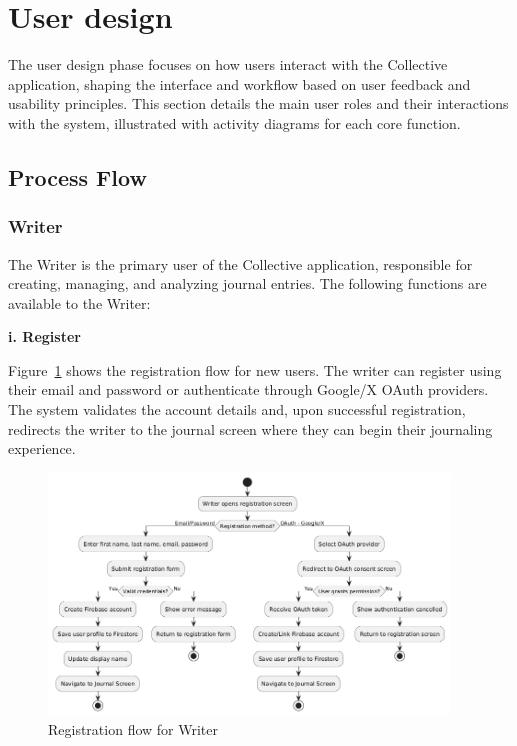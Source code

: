 \section{User design}\label{sec:userDesign}


The user design phase focuses on how users interact with the Collective application, shaping the interface and workflow based on user feedback and usability principles. This section details the main user roles and their interactions with the system, illustrated with activity diagrams for each core function.

\subsection{Process Flow}\label{subsec:processFlow}

\subsubsection{Writer}\label{subsubsec:writer}

The Writer is the primary user of the Collective application, responsible for creating, managing, and analyzing journal entries. The following functions are available to the Writer:

\textbf{i. Register}

Figure~\ref{fig:register-flow} shows the registration flow for new users. The writer can register using their email and password or authenticate through Google/X OAuth providers. The system validates the account details and, upon successful registration, redirects the writer to the journal screen where they can begin their journaling experience.

\begin{figure}[H]
\centering
\includegraphics[width=0.95\textwidth,height=0.7\textheight,keepaspectratio]{files/imgs/register_flow.png}
\caption{Registration flow for Writer}
\label{fig:register-flow}
\end{figure}
\clearpage

